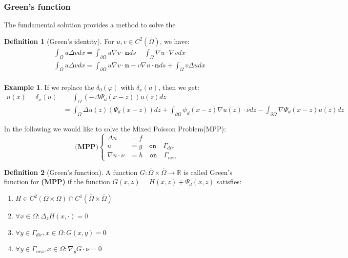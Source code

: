 \documentclass[a4paper,11pt,oneside,fleqn]{book}
\theoremstyle{definition}
\newtheorem{definition}{Definition}[section]
\newtheorem*{example}{Example}
\theoremstyle{remark}
\begin{document}
\subsubsection{Green's function}
The fundamental solution provides a method to solve the 
\begin{definition}[Green's identity]
	For $u, v \in C^2(\overline{\Omega})$, we have:
	\begin{equation}
		\begin{aligned}
			& \int_\Omega u \Delta v dx = \int_{\partial \Omega} u  \nabla v \cdot   \mathbf{n}  ds - \int_\Omega \nabla u \cdot  \nabla v dx \\
			& \int_\Omega u \Delta v dx = \int_{\partial \Omega}
			u \nabla v \cdot \mathbf{n} - v \nabla u \cdot \mathbf{n} ds 
			+ \int_\Omega v \Delta u dx\\
		\end{aligned}
	\end{equation}
\end{definition}

\begin{example}
If we replace the $\delta_0(\varphi)$ with $\delta_x(u)$, then we get:
\begin{align*}
	u(x) = \delta_x(u) &= \int_\Omega (- \Delta \Psi_d(x-z)) u(z) dz \\
	&= \int_\Omega \Delta u(z)(\Psi_d(x-z))dz + \int_{\partial \Omega} \psi_d(x-z)\nabla u(z)\cdot \nu dz - \int_{\partial \Omega}\nabla\Psi_d(x-z) u(z)dz
\end{align*}
\end{example}

In the following we would like to solve the Mixed Poisson Problem(MPP):
\begin{equation}
\textbf{(MPP)}\left\{
\begin{aligned}
	 	\Delta u &= f\\
	 	u &= g \quad \texttt{on} \quad \Gamma_{dir} \\
	 	\nabla u \cdot \nu &= h \quad \texttt{on} \quad \Gamma_{neu}
\end{aligned}
\right.
\end{equation}

\begin{definition}[Green's function]
	A function $G:\bar{\Omega} \times \bar{\Omega} \rightarrow \mathbb{R}$ is called Green's function for \textbf{(MPP)} if the function $ G(x, z) = H(x, z) + \Psi_d(x, z)$ satisfies:
	\begin{enumerate}
		\item $H \in C^2(\Omega \times \Omega) \cap C^1(\bar{\Omega} \times \bar{\Omega})$
		\item $\forall x \in \Omega : \Delta_z H(x, \cdot) = 0$
		\item $\forall y \in \Gamma_{dir}, x \in \Omega: G(x, y) = 0$
		\item $\forall y \in \Gamma_{neu}, x \in \Omega: \nabla_y G \cdot \nu = 0$
	\end{enumerate}
\end{definition}
\end{document}
